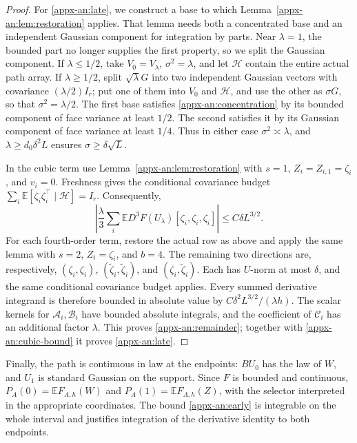 \documentclass[11pt,letterpaper]{article}
\theoremstyle{remark}
\newcommand{\E}{\mathbb E}
\begin{document}
\begin{proof}
For \eqref{appx-an:late}, we construct a base to which
Lemma~\ref{appx-an:lem:restoration} applies. That lemma needs both a
concentrated base and an independent Gaussian component for integration
by parts. Near \(\lambda=1\), the bounded part no longer supplies the
first property, so we split the Gaussian component.  If \(\lambda\le1/2\), take
\(V_0=V_\lambda\), \(\sigma^2=\lambda\), and let \(\mathcal H\)
contain the entire actual path array.  If \(\lambda\ge1/2\), split
\(\sqrt\lambda G\) into two independent Gaussian vectors with
covariance \((\lambda/2)I_r\); put one of them into \(V_0\) and
\(\mathcal H\), and use the other as \(\sigma G\), so that
\(\sigma^2=\lambda/2\).  The first base satisfies
\eqref{appx-an:concentration} by its bounded component of face variance
at least \(1/2\).  The second satisfies it by its Gaussian component
of face variance at least \(1/4\).  Thus in either case
\(\sigma^2\asymp\lambda\), and
\(\lambda\ge d_0\delta^2L\) ensures
\(\sigma\ge\delta\sqrt L\).

In the cubic term use Lemma~\ref{appx-an:lem:restoration} with
\(s=1\), \(Z_i=Z_{i,1}=\zeta_i\), and \(v_i=0\).
Freshness gives the conditional covariance budget
\(\sum_i\E[\zeta_i\zeta_i^\top\mid\mathcal H]=I_r\).
Consequently,
\begin{equation}
 \left|\frac\lambda3\sum_i\E D^3F(U_\lambda)
                    [\zeta_i,\zeta_i,\zeta_i]\right|
 \le C\delta L^{3/2}.
 \label{appx-an:cubic-bound}
\end{equation}
For each fourth-order term, restore the actual row as above and
apply the same lemma with \(s=2\), \(Z_i=\zeta_i\), and \(b=4\).
The remaining two directions are, respectively,
\((\zeta_i,\zeta_i)\),
\((\widetilde\zeta_i,\widetilde\zeta_i)\), and
\((\zeta_i,\widetilde\zeta_i)\).  Each has \(U\)-norm at most
\(\delta\), and the same conditional covariance budget applies.
Every summed derivative integrand is therefore bounded in absolute
value by \(C\delta^2L^{3/2}/(\lambda h)\).
The scalar kernels for \(\mathcal A_i,\mathcal B_i\) have bounded
absolute integrals, and the coefficient of \(\mathcal C_i\) has
an additional factor \(\lambda\).  This proves
\eqref{appx-an:remainder}; together with \eqref{appx-an:cubic-bound}
it proves \eqref{appx-an:late}.
\end{proof}

Finally, the path is continuous in law at the endpoints:
\(BU_0\) has the law of \(W\), and \(U_1\) is standard Gaussian
on the support.  Since \(F\) is bounded and continuous,
\(P_A(0)=\E F_{A,h}(W)\) and
\(P_A(1)=\E F_{A,h}(Z)\), with the selector interpreted in the
appropriate coordinates.  The bound \eqref{appx-an:early} is integrable
on the whole interval and justifies integration of the derivative
identity to both endpoints.
\end{document}
